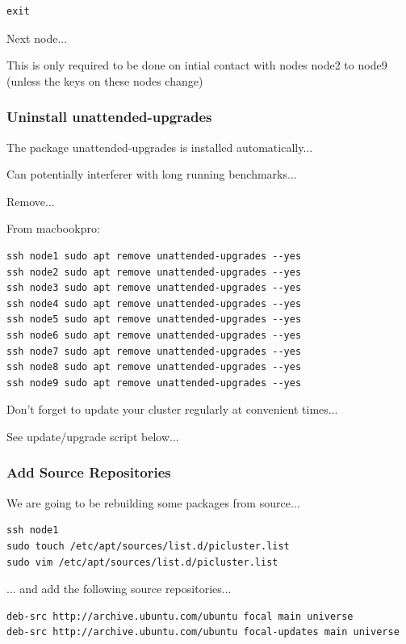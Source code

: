 \documentclass{article}
\begin{document}
\begin{lstlisting}[]
exit
\end{lstlisting}

Next node...

This is only required to be done on intial contact with nodes node2 to node9 (unless the keys on these nodes change)



\subsubsection{Uninstall unattended-upgrades}

The package unattended-upgrades is installed automatically...

Can potentially interferer with long running benchmarks...

Remove...

From macbookpro:

\begin{lstlisting}[]
ssh node1 sudo apt remove unattended-upgrades --yes
ssh node2 sudo apt remove unattended-upgrades --yes
ssh node3 sudo apt remove unattended-upgrades --yes
ssh node4 sudo apt remove unattended-upgrades --yes
ssh node5 sudo apt remove unattended-upgrades --yes
ssh node6 sudo apt remove unattended-upgrades --yes
ssh node7 sudo apt remove unattended-upgrades --yes
ssh node8 sudo apt remove unattended-upgrades --yes
ssh node9 sudo apt remove unattended-upgrades --yes
\end{lstlisting}

Don't forget to update your cluster regularly at convenient times...

See update/upgrade script below...


\subsubsection{Add Source Repositories}

We are going to be rebuilding some packages from source...

\begin{lstlisting}[]
ssh node1
sudo touch /etc/apt/sources/list.d/picluster.list
sudo vim /etc/apt/sources/list.d/picluster.list
\end{lstlisting}

... and add the following source repositories...

\begin{lstlisting}[caption=/etc/apt/sources.list.d/picluster.list]
deb-src http://archive.ubuntu.com/ubuntu focal main universe
deb-src http://archive.ubuntu.com/ubuntu focal-updates main universe
\end{lstlisting}
\end{document}
